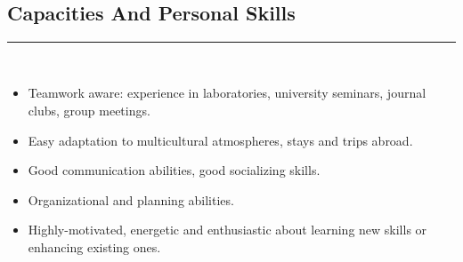 \documentclass[10pt]{article} %
\begin{document}
\begin{minipage}[t]{0.44\textwidth}
\begin{tabular}{rl}

\end{tabular}\\[5pt]


\begin{spacing}{0.0}
\section{Capacities And Personal Skills}
\end{spacing}
\rule{8cm}{0.4pt}
\\

\begin{itemize}
\item Teamwork aware: experience in laboratories, university seminars, journal clubs, group meetings. 
\item Easy adaptation to multicultural atmospheres, stays and trips abroad. 
\item Good communication abilities, good socializing skills.
\item Organizational and planning abilities.
\item Highly-motivated, energetic and enthusiastic about learning new skills or enhancing existing ones.
\end{itemize}

\end{minipage} %
\end{document}
